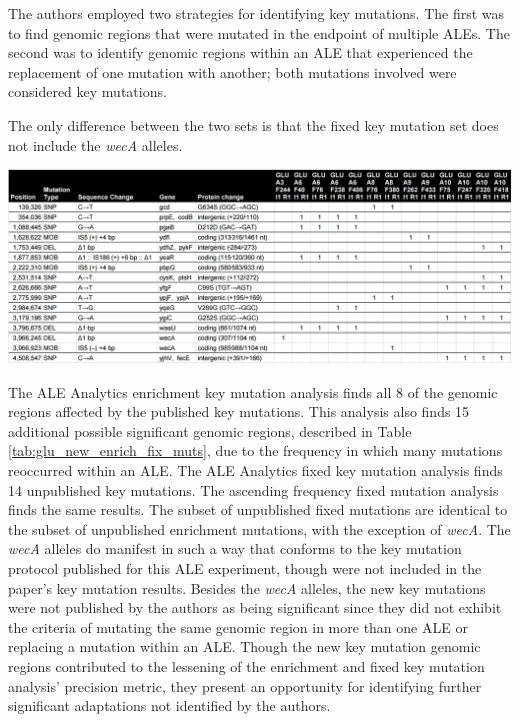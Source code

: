 \documentclass[12pt,final,masters,chapterheads]{ucsd}  %
\begin{document}
The authors employed two strategies for identifying key mutations. The first was to find genomic regions that were mutated in the endpoint of multiple ALEs.
The second was to identify genomic regions within an ALE that experienced the replacement of one mutation with another; both mutations involved were considered key mutations.
\begin{table}[H]
  \centering
  \caption[A combination of the new enrichment and fixed key mutations found by the automated analysis.]{ The only difference between the two sets is that the fixed key mutation set does not include the \textit{wecA} alleles.}
  \includegraphics[width=\textwidth]{glu_new_enrich_fix_muts.png}
  \label{tab:glu_new_enrich_fix_muts}
\end{table}
The ALE Analytics enrichment key mutation analysis finds all 8 of the genomic regions affected by the published key mutations. This analysis also finds 15 additional possible significant genomic regions, described in Table \ref{tab:glu_new_enrich_fix_muts}, due to the frequency in which many mutations reoccurred within an ALE. The ALE Analytics fixed key mutation analysis finds 14 unpublished key mutations. The ascending frequency fixed mutation analysis finds the same results. The subset of unpublished fixed mutations are identical to the subset of unpublished enrichment mutations, with the exception of \textit{wecA}. The \textit{wecA} alleles do manifest in such a way that conforms to the key mutation protocol published for this ALE experiment, though were not included in the paper's key mutation results. Besides the \textit{wecA} alleles, the new key mutations were not published by the authors as being significant since they did not exhibit the criteria of mutating the same genomic region in more than one ALE or replacing a mutation within an ALE. Though the new key mutation genomic regions contributed to the lessening of the enrichment and fixed key mutation analysis' precision metric, they present an opportunity for identifying further significant adaptations not identified by the authors.
\end{document}
